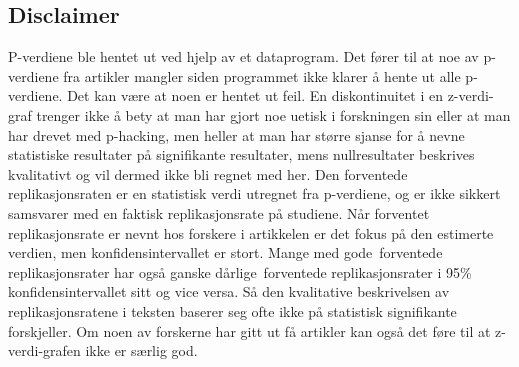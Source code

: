 \documentclass[doc,norsk]{apa7}
\begin{document}
\subsection{Disclaimer}
P-verdiene ble hentet ut ved hjelp av et dataprogram. Det fører til at noe av p-verdiene fra artikler mangler siden programmet ikke klarer å hente ut alle p-verdiene. Det kan være at noen er hentet ut feil. En diskontinuitet i en z-verdi-graf trenger ikke å bety at man har gjort noe uetisk i forskningen sin eller at man har drevet med p-hacking, men heller at man har større sjanse for å nevne statistiske resultater på signifikante resultater, mens nullresultater beskrives kvalitativt og vil dermed ikke bli regnet med her. Den forventede replikasjonsraten er en statistisk verdi utregnet fra p-verdiene, og er ikke sikkert samsvarer med en faktisk replikasjonsrate på studiene. Når forventet replikasjonsrate er nevnt hos forskere i artikkelen er det fokus på den estimerte verdien, men konfidensintervallet er stort. Mange med \guillemetleft gode\guillemetright\ forventede replikasjonsrater har også ganske \guillemetleft dårlige\guillemetright\ forventede replikasjonsrater i 95\% konfidensintervallet sitt og vice versa. Så den kvalitative beskrivelsen av replikasjonsratene i teksten baserer seg ofte ikke på statistisk signifikante forskjeller. Om noen av forskerne har gitt ut få artikler kan også det føre til at z-verdi-grafen ikke er særlig god.

\printbibliography

\processdelayedfloats
\end{document}
